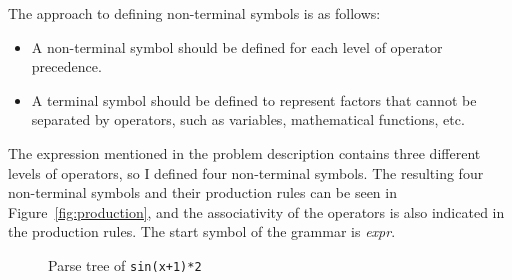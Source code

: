 \documentclass[a4paper,oneside]{book}
\begin{document}
The approach to defining non-terminal symbols is as follows:

\begin{itemize}
    \item A non-terminal symbol should be defined for each level of operator precedence.
    \item A terminal symbol should be defined to represent factors that cannot be separated by operators, such as variables, mathematical functions, etc.
\end{itemize}

The expression mentioned in the problem description contains three different levels of operators, so I defined four non-terminal symbols. The resulting four non-terminal symbols and their production rules can be seen in Figure~\ref{fig:production}, and the associativity of the operators is also indicated in the production rules. The start symbol of the grammar is \textit{expr}.

\begin{figure}
    \caption{Parse tree of \texttt{sin(x+1)*2}}\label{fig:parse_tree}
\end{figure}
\end{document}
